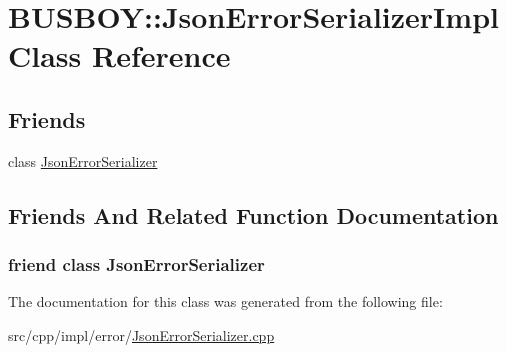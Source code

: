 \hypertarget{classBUSBOY_1_1JsonErrorSerializerImpl}{
\section{BUSBOY::JsonErrorSerializerImpl Class Reference}
\label{classBUSBOY_1_1JsonErrorSerializerImpl}
}
\subsection*{Friends}
\begin{DoxyCompactItemize}
\item 
class \hyperlink{classBUSBOY_1_1JsonErrorSerializerImpl_ac95361963b68f781201a3d405afb0bba}{JsonErrorSerializer}
\end{DoxyCompactItemize}


\subsection{Friends And Related Function Documentation}
\hypertarget{classBUSBOY_1_1JsonErrorSerializerImpl_ac95361963b68f781201a3d405afb0bba}{
\subsubsection[{JsonErrorSerializer}]{\setlength{\rightskip}{0pt plus 5cm}friend class {\bf JsonErrorSerializer}}}
\label{classBUSBOY_1_1JsonErrorSerializerImpl_ac95361963b68f781201a3d405afb0bba}


The documentation for this class was generated from the following file:\begin{DoxyCompactItemize}
\item 
src/cpp/impl/error/\hyperlink{JsonErrorSerializer_8cpp}{JsonErrorSerializer.cpp}\end{DoxyCompactItemize}
